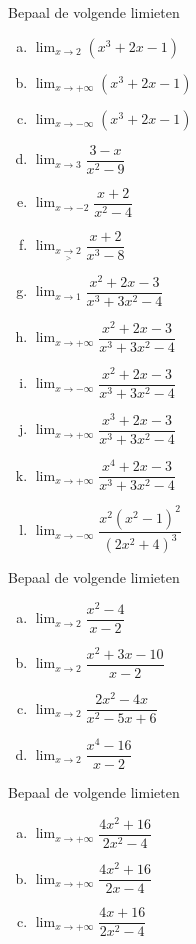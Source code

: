 \documentclass[12pt]{article}
\begin{document}
\begin{oefening}
  Bepaal de volgende limieten
  \begin{multicols}{3}
  \begin{enumerate}[(a)]
  \itemsep1em
  \item $\displaystyle\lim_{x\to 2}\left(x^3+2x-1\right)$
  \item $\displaystyle\lim_{x\to +\infty}\left(x^3+2x-1\right)$
  \item $\displaystyle\lim_{x\to -\infty}\left(x^3+2x-1\right)$
  \item $\displaystyle\lim_{x\to 3}\dfrac{3-x}{x^2-9}$
  \item $\displaystyle\lim_{x\to -2}\dfrac{x+2}{x^2-4}$
  \item $\displaystyle\lim_{x\underset{>}{\to} 2}\dfrac{x+2}{x^3-8}$
  \item $\displaystyle\lim_{x\to 1}\dfrac{x^2+2x-3}{x^3+3x^2-4}$
  \item $\displaystyle\lim_{x\to +\infty}\dfrac{x^2+2x-3}{x^3+3x^2-4}$
  \item $\displaystyle\lim_{x\to -\infty}\dfrac{x^2+2x-3}{x^3+3x^2-4}$
  \item $\displaystyle\lim_{x\to +\infty}\dfrac{x^3+2x-3}{x^3+3x^2-4}$
  \item $\displaystyle\lim_{x\to +\infty}\dfrac{x^4+2x-3}{x^3+3x^2-4}$
  \item $\displaystyle\lim_{x\to -\infty}\dfrac{x^2(x^2-1)^2}{(2x^2+4)^3}$
  \end{enumerate}
  \end{multicols}
\end{oefening}

\begin{oefening}
  Bepaal de volgende limieten
  \begin{multicols}{2}
  \begin{enumerate}[(a)]
  \itemsep1em
  \item $\displaystyle\lim_{x\to 2}\dfrac{x^2-4}{x-2}$
  \item $\displaystyle\lim_{x\to 2}\dfrac{x^2+3x-10}{x-2}$
  \item $\displaystyle\lim_{x\to 2}\dfrac{2x^2-4x}{x^2-5x+6}$
  \item $\displaystyle\lim_{x\to 2}\dfrac{x^4-16}{x-2}$
  \end{enumerate}
  \end{multicols}
\end{oefening}

\begin{oefening}
  Bepaal de volgende limieten
  \begin{multicols}{3}
  \begin{enumerate}[(a)]
  \itemsep1em
  \item $\displaystyle\lim_{x\to +\infty}\dfrac{4x^2+16}{2x^2-4}$
  \item $\displaystyle\lim_{x\to +\infty}\dfrac{4x^2+16}{2x-4}$
  \item $\displaystyle\lim_{x\to +\infty}\dfrac{4x+16}{2x^2-4}$
  \end{enumerate}
  \end{multicols}
\end{oefening}
\end{document}
